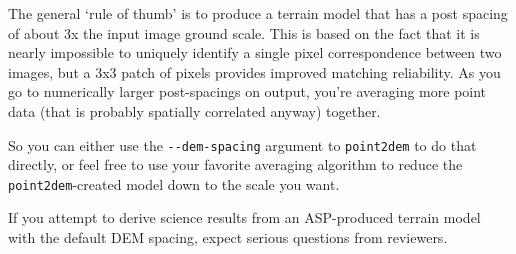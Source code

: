 The general `rule of thumb' is to produce a terrain model that has a
post spacing of about 3x the input image ground scale.  This is based
on the fact that it is nearly impossible to uniquely identify a single
pixel correspondence between two images, but a 3x3 patch of pixels
provides improved matching reliability.  As you go to numerically
larger post-spacings on output, you're averaging more point data (that
is probably spatially correlated anyway) together.

So you can either use the \texttt{-\/-dem-spacing} argument to
\texttt{point2dem} to do that directly, or feel free to use your
favorite averaging algorithm to reduce the \texttt{point2dem}-created
model down to the scale you want.

If you attempt to derive science results from an ASP-produced terrain model
with the default DEM spacing, expect serious questions from reviewers.



